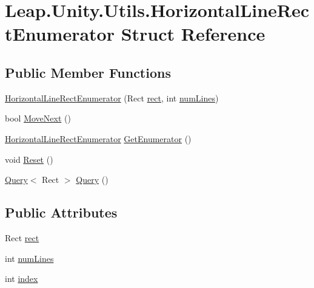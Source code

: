 \hypertarget{struct_leap_1_1_unity_1_1_utils_1_1_horizontal_line_rect_enumerator}{}\section{Leap.\+Unity.\+Utils.\+Horizontal\+Line\+Rect\+Enumerator Struct Reference}
\label{struct_leap_1_1_unity_1_1_utils_1_1_horizontal_line_rect_enumerator}
\subsection*{Public Member Functions}
\begin{DoxyCompactItemize}
\item 
\mbox{\hyperlink{struct_leap_1_1_unity_1_1_utils_1_1_horizontal_line_rect_enumerator_ac145ae10d58eccdf92e6e0c1acb1e1dc}{Horizontal\+Line\+Rect\+Enumerator}} (Rect \mbox{\hyperlink{struct_leap_1_1_unity_1_1_utils_1_1_horizontal_line_rect_enumerator_a98c4b7eeff45bb3158f534e5f63b99c5}{rect}}, int \mbox{\hyperlink{struct_leap_1_1_unity_1_1_utils_1_1_horizontal_line_rect_enumerator_aa1cc32f586fd49f720ae788a52f95f1e}{num\+Lines}})
\item 
bool \mbox{\hyperlink{struct_leap_1_1_unity_1_1_utils_1_1_horizontal_line_rect_enumerator_abf4035ccf21b27f98d37bbd7911f4222}{Move\+Next}} ()
\item 
\mbox{\hyperlink{struct_leap_1_1_unity_1_1_utils_1_1_horizontal_line_rect_enumerator}{Horizontal\+Line\+Rect\+Enumerator}} \mbox{\hyperlink{struct_leap_1_1_unity_1_1_utils_1_1_horizontal_line_rect_enumerator_ad6281ec8a5551d7fb26ae1c25eba4682}{Get\+Enumerator}} ()
\item 
void \mbox{\hyperlink{struct_leap_1_1_unity_1_1_utils_1_1_horizontal_line_rect_enumerator_a8db0b31549dcaa4e5ffee6843aaa4bb5}{Reset}} ()
\item 
\mbox{\hyperlink{struct_leap_1_1_unity_1_1_query_1_1_query}{Query}}$<$ Rect $>$ \mbox{\hyperlink{struct_leap_1_1_unity_1_1_utils_1_1_horizontal_line_rect_enumerator_a2f2af1155fbf3ce0125acd7b0896975e}{Query}} ()
\end{DoxyCompactItemize}
\subsection*{Public Attributes}
\begin{DoxyCompactItemize}
\item 
Rect \mbox{\hyperlink{struct_leap_1_1_unity_1_1_utils_1_1_horizontal_line_rect_enumerator_a98c4b7eeff45bb3158f534e5f63b99c5}{rect}}
\item 
int \mbox{\hyperlink{struct_leap_1_1_unity_1_1_utils_1_1_horizontal_line_rect_enumerator_aa1cc32f586fd49f720ae788a52f95f1e}{num\+Lines}}
\item 
int \mbox{\hyperlink{struct_leap_1_1_unity_1_1_utils_1_1_horizontal_line_rect_enumerator_af1b8cd1077d7b1f2e496fcf244c5102a}{index}}
\end{DoxyCompactItemize}
